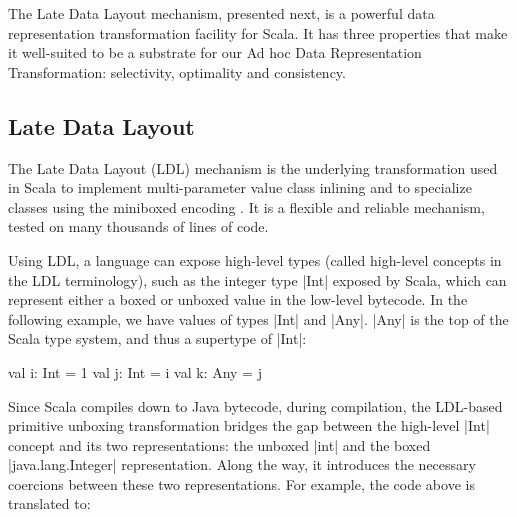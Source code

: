 The Late Data Layout mechanism, presented next, is a powerful data
representation transformation facility for Scala.  It has three
properties that make it well-suited to be a substrate for our Ad hoc
Data Representation Transformation: selectivity, optimality and
consistency.


\subsection{Late Data Layout}

The Late Data Layout (LDL) mechanism \cite{ldl} is the underlying transformation used in Scala to implement multi-parameter value class inlining and to specialize classes using the miniboxed encoding \cite{miniboxing}. It is a flexible and reliable mechanism, tested on many thousands of lines of code. %


Using LDL, a language can expose high-level types (called high-level concepts in the LDL terminology), such as the integer type |Int| exposed by Scala, which can represent either a boxed or unboxed value in the low-level bytecode. In the following example, we have values of types |Int| and |Any|. |Any| is the top of the Scala type system, and thus a supertype of |Int|:

\begin{lstlisting-nobreak}
val i: Int = 1
val j: Int = i
val k: Any = j
\end{lstlisting-nobreak}

Since Scala compiles down to Java bytecode, during compilation, the LDL-based primitive unboxing transformation bridges the gap between the high-level |Int| concept and its two representations: the unboxed |int| and the boxed |java.lang.Integer| representation. Along the way, it introduces the necessary coercions between these two representations. For example, the code above is translated to:

